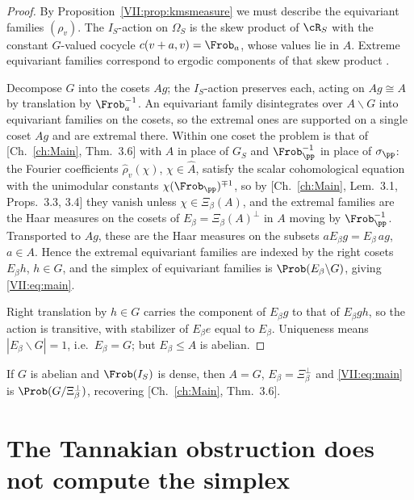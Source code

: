 \begin{proof}
By Proposition~\ref{VII:prop:kmsmeasure} we must describe the equivariant families $(\rho_v)$.
The $I_S$-action on $\Omega_S$ is the skew product of $\cR_S$ with the constant $G$-valued
cocycle $c(v+a,v)=\Frob_a$, whose values lie in $A$. Extreme equivariant families correspond
to ergodic components of that skew product \cite{FM}.

Decompose $G$ into the cosets $Ag$; the $I_S$-action preserves each, acting on
$Ag\cong A$ by translation by $\Frob_a^{-1}$. An equivariant family disintegrates over
$A\backslash G$ into equivariant families on the cosets, so the extremal ones are
supported on a single coset $Ag$ and are extremal there. Within one coset the problem is
that of [Ch.~\ref{ch:Main}, Thm.~3.6] with $A$ in place of $G_S$ and $\Frob_\pp^{-1}$ in place of
$\sigma_\pp$: the Fourier coefficients $\hat\rho_v(\chi)$, $\chi\in\widehat A$, satisfy the
scalar cohomological equation with the unimodular constants $\chi(\Frob_\pp)^{\mp1}$, so
by [Ch.~\ref{ch:Main}, Lem.~3.1, Props.~3.3, 3.4] they vanish unless $\chi\in\Xi_\beta(A)$, and the
extremal families are the Haar measures on the cosets of $E_\beta=\Xi_\beta(A)^\perp$ in
$A$ moving by $\Frob_\pp^{-1}$. Transported to $Ag$, these are the Haar measures on the
subsets $aE_\beta g=E_\beta\,ag$, $a\in A$. Hence the extremal equivariant families are
indexed by the right cosets $E_\beta h$, $h\in G$, and the simplex of equivariant families
is $\Prob(E_\beta\backslash G)$, giving \eqref{VII:eq:main}.

Right translation by $h\in G$ carries the component of $E_\beta g$ to that of $E_\beta gh$,
so the action is transitive, with stabilizer of $E_\beta e$ equal to $E_\beta$. Uniqueness
means $|E_\beta\backslash G|=1$, i.e.\ $E_\beta=G$; but $E_\beta\le A$ is abelian.
\end{proof}

\begin{corollary}\label{VII:cor:abelian}
If $G$ is abelian and $\Frob(I_S)$ is dense, then $A=G$, $E_\beta=\Xi_\beta^\perp$ and
\eqref{VII:eq:main} is $\Prob(G/\Xi_\beta^\perp)$, recovering [Ch.~\ref{ch:Main}, Thm.~3.6].
\end{corollary}

\section{The Tannakian obstruction does not compute the simplex}

